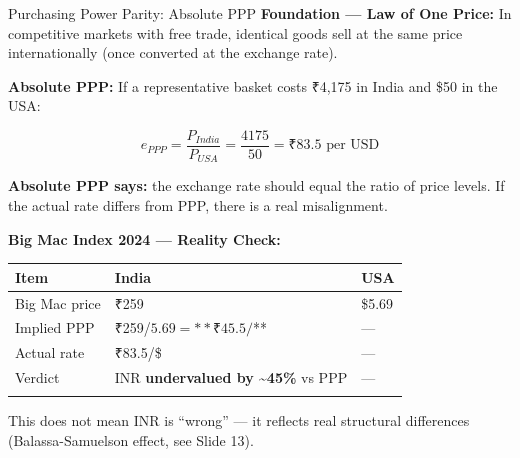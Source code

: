 \documentclass[
  ignorenonframetext,
  aspectratio=169,
]{beamer}
\makeatletter
\let\quarto@originallabel\label
\DeclareRobustCommand*{\label}[1]{\quarto@originallabel{#1}}
\makeatother
\begin{document}
\begin{frame}{Purchasing Power Parity: Absolute PPP}
\label{purchasing-power-parity-absolute-ppp}
\textbf{Foundation --- Law of One Price:} In competitive markets with
free trade, identical goods sell at the same price internationally (once
converted at the exchange rate).

\textbf{Absolute PPP:} If a representative basket costs ₹4,175 in India
and \$50 in the USA:

\[e_{PPP} = \frac{P_{India}}{P_{USA}} = \frac{4175}{50} = ₹83.5 \text{ per USD}\]

\textbf{Absolute PPP says:} the exchange rate should equal the ratio of
price levels. If the actual rate differs from PPP, there is a real
misalignment.

\textbf{Big Mac Index 2024 --- Reality Check:}

\begin{longtable}[]{@{}lll@{}}
\toprule\noalign{}
Item & India & USA \\
\midrule\noalign{}
\endhead
Big Mac price & ₹259 & \$5.69 \\
Implied PPP & ₹259/\(5.69 = **₹45.5/\)** & --- \\
Actual rate & ₹83.5/\$ & --- \\
Verdict & INR \textbf{undervalued by \textasciitilde45\%} vs PPP &
--- \\
\bottomrule\noalign{}
\end{longtable}

This does not mean INR is ``wrong'' --- it reflects real structural
differences (Balassa-Samuelson effect, see Slide 13).
\end{frame}
\end{document}

